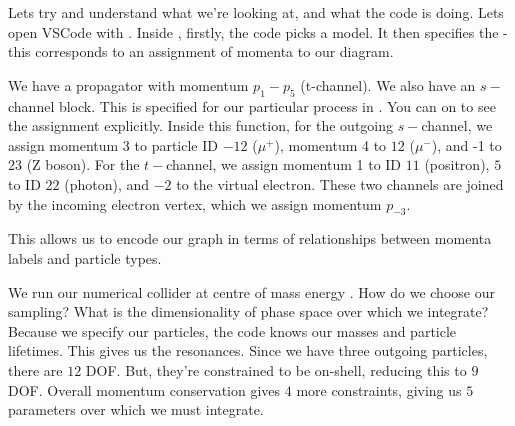Lets try and understand what we're looking at, and what the code is doing. Lets open VSCode with . Inside , firstly, the code picks a model. It then specifies the  - this corresponds to an assignment of momenta to our diagram.
\begin{center}
\end{center}

We have a propagator with momentum $p_1-p_5$ (t-channel). We also have an $s-$channel block. This is specified for our particular process in . You can  on   to see the assignment explicitly. Inside this function, for the outgoing $s-$channel,  we assign momentum 3 to particle ID $-12$ ($\mu^+$), momentum 4 to $12$ ($\mu^-$), and -1 to $23$ (Z boson). For the $t-$channel, we assign momentum 1 to ID $11$ (positron), $5$ to ID $22$ (photon), and $-2$ to the virtual electron. These two channels are joined by the incoming electron vertex, which we assign momentum $p_{-3}$.

This allows us to encode our graph in terms of relationships between momenta labels and particle types.

We run our numerical collider at centre of mass energy . 
How do we choose our sampling? What is the dimensionality of phase space over which we integrate? Because we specify our particles, the code knows our masses and particle lifetimes. This gives us the resonances. Since we have three outgoing particles, there are $12$ DOF. But, they're constrained to be on-shell, reducing this to $9$ DOF. Overall momentum conservation gives $4$ more constraints, giving us $5$ parameters over which we must integrate.

